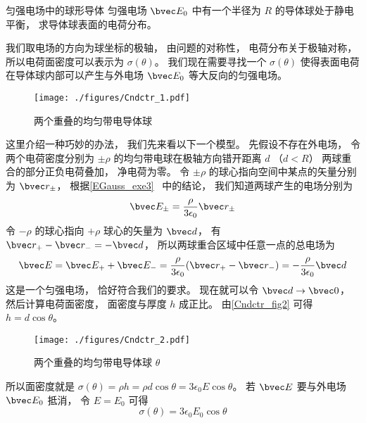 \begin{example}{匀强电场中的球形导体}
匀强电场 $\bvec E_0$ 中有一个半径为 $R$ 的导体球处于静电平衡， 求导体球表面的电荷分布。

我们取电场的方向为球坐标的极轴， 由问题的对称性， 电荷分布关于极轴对称， 所以电荷面密度可以表示为 $\sigma(\theta)$。 我们现在需要寻找一个 $\sigma(\theta)$ 使得表面电荷在导体球内部可以产生与外电场 $\bvec E_0$ 等大反向的匀强电场。

\begin{figure}[ht]
\centering
\texttt{[image: ./figures/Cndctr\_1.pdf]}
\caption{两个重叠的均匀带电导体球} \label{Cndctr_fig1}
\end{figure}

这里介绍一种巧妙的办法， 我们先来看以下一个模型。 先假设不存在外电场， 令两个电荷密度分别为 $\pm\rho$ 的均匀带电球在极轴方向错开距离 $d$ （$d < R$） 两球重合的部分正负电荷叠加， 净电荷为零。 令 $\pm\rho$ 的球心指向空间中某点的矢量分别为 $\bvec r_\pm$， 根据\autoref{EGauss_exe3}~ 中的结论， 我们知道两球产生的电场分别为
\begin{equation}
\bvec E_\pm = \frac{\rho}{3\epsilon_0}\bvec r_\pm
\end{equation}
令 $-\rho$ 的球心指向 $+\rho$ 球心的矢量为 $\bvec d$， 有 $\bvec r_+ - \bvec r_- = -\bvec d$， 所以两球重合区域中任意一点的总电场为
\begin{equation}
\bvec E = \bvec E_+ + \bvec E_- = \frac{\rho}{3\epsilon_0}(\bvec r_+ - \bvec r_-) = -\frac{\rho}{3\epsilon_0}\bvec d
\end{equation}
这是一个匀强电场， 恰好符合我们的要求。 现在就可以令 $\bvec d\to \bvec 0$， 然后计算电荷面密度， 面密度与厚度 $h$ 成正比。 由\autoref{Cndctr_fig2} 可得 $h = d\cos\theta$。

\begin{figure}[ht]
\centering
\texttt{[image: ./figures/Cndctr\_2.pdf]}
\caption{两个重叠的均匀带电导体球 $\theta$} \label{Cndctr_fig2}
\end{figure}

所以面密度就是 $\sigma(\theta) = \rho h = \rho d\cos\theta = 3\epsilon_0 E \cos\theta$。 若 $\bvec E$ 要与外电场 $\bvec E_0$ 抵消， 令 $E = E_0$ 可得
\begin{equation}
\sigma(\theta) = 3\epsilon_0 E_0 \cos\theta
\end{equation}
\end{example}

